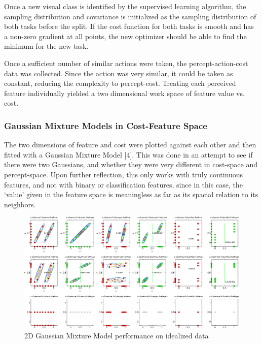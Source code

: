 \documentclass[12pt]{article}
\begin{document}
Once a new visual class is identified by the supervised learning algorithm, the sampling distribution and covariance is initialized as the sampling distribution of both tasks before the split. If the cost function for both tasks is smooth and has a non-zero gradient at all points, the new optimizer should be able to find the minimum for the new task. 





Once a sufficient number of similar actions were taken, the percept-action-cost data was collected. Since the action was very similar, it could be taken as constant, reducing the complexity to percept-cost. Treating each perceived feature individually yielded a two dimensional work space of feature value vs. cost. 

\subsubsection{Gaussian Mixture Models in Cost-Feature Space}

The two dimensions of feature and cost were plotted against each other and then fitted with a Gaussian Mixture Model [4]. This was done in an attempt to see if there were two Gaussians, and whether they were very different in cost-space and percept-space. Upon further reflection, this only works with truly continuous features, and not with binary or classification features, since in this case, the `value' given in the feature space is meaningless as far as its spacial relation to its neighbors.

\begin{figure}[ht]
  \centerline{
  \includegraphics[width=1.5\columnwidth]{2d_gaussians.png}}
  \caption{\label{fig_2d_gaussians} 2D Gaussian Mixture Model performance on idealized data}
  \label{fig:2Dgaussians}
\end{figure}
\end{document}
